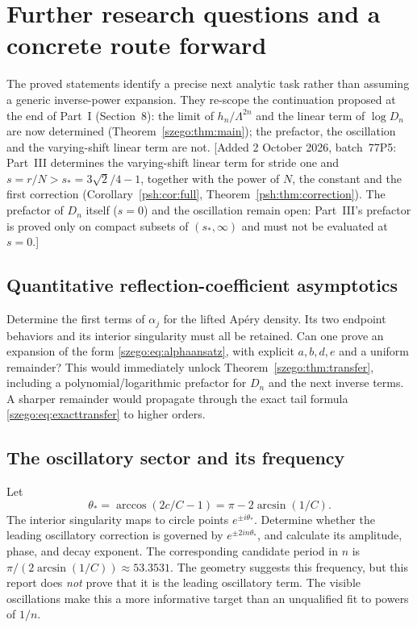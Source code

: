 \documentclass[11pt,a4paper]{article}
\numberwithin{equation}{section}
\theoremstyle{remark}\newtheorem{remark}[theorem]{Remark}
\begin{document}
\section{Further research questions and a concrete route forward}
\label{szego:sec:questions}
The proved statements identify a precise next analytic task rather than
assuming a generic inverse-power expansion. They re-scope the continuation
proposed at the end of Part~I (Section~8): the limit of $h_n/\Lambda^{2n}$ and
the linear term of $\log D_n$ are now determined
(Theorem~\ref{szego:thm:main}); the prefactor, the oscillation and the
varying-shift linear term are not.
[Added 2 October 2026, batch~77P5: Part~III determines the varying-shift
linear term for stride one and $s=r/N>s_*=3\sqrt2/4-1$, together with the
power of $N$, the constant and the first correction
(Corollary~\ref{psh:cor:full}, Theorem~\ref{psh:thm:correction}). The
prefactor of $D_n$ itself ($s=0$) and the oscillation remain open: Part~III's
prefactor is proved only on compact subsets of $(s_*,\infty)$ and must not
be evaluated at $s=0$.]

\subsection{Quantitative reflection-coefficient asymptotics}
Determine the first terms of $\alpha_j$ for the lifted Ap\'ery density.
Its two endpoint behaviors and its interior singularity must all be retained.
Can one prove an expansion of the form \eqref{szego:eq:alphaansatz}, with explicit
$a,b,d,e$ and a uniform remainder? This would immediately unlock
Theorem~\ref{szego:thm:transfer}, including a polynomial/logarithmic prefactor for
$D_n$ and the next inverse terms.
A sharper remainder would propagate through the exact tail formula
\eqref{szego:eq:exacttransfer} to higher orders.

\subsection{The oscillatory sector and its frequency}
Let
\[
 \theta_*=\arccos(2c/C-1)=\pi-2\arcsin(1/C).
\]
The interior singularity maps to circle points $e^{\pm i\theta_*}$.
Determine whether the leading oscillatory correction is governed by
$e^{\pm2in\theta_*}$, and calculate its amplitude, phase, and decay exponent.
The corresponding candidate period in $n$ is
$\pi/(2\arcsin(1/C))\approx53.3531$.
The geometry suggests this frequency, but this report does \emph{not}
prove that it is the leading oscillatory term.
The visible oscillations make this a more informative target than an
unqualified fit to powers of $1/n$.
\end{document}
